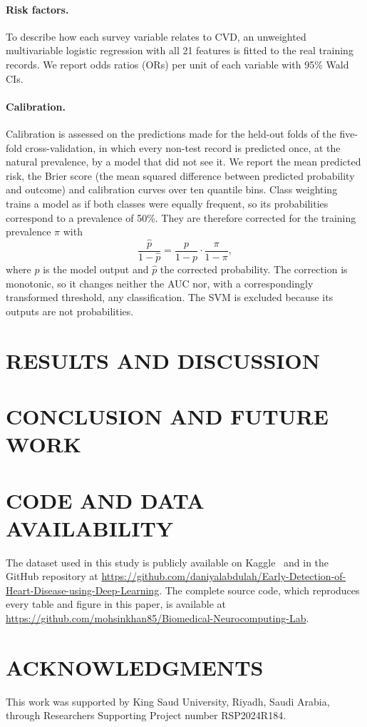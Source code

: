 \documentclass[11pt,a4paper]{article}
\begin{document}
\paragraph{Risk factors.} To describe how each survey variable relates to
CVD, an unweighted multivariable logistic regression with all 21 features
is fitted to the real training records. We report odds ratios (ORs) per
unit of each variable with 95\% Wald CIs.

\paragraph{Calibration.} Calibration is assessed on the predictions made
for the held-out folds of the five-fold cross-validation, in which every
non-test
record is predicted once, at the natural prevalence, by a model that did not
see it. We report the mean predicted risk, the Brier score (the mean squared
difference between predicted probability and outcome) and calibration curves
over ten quantile bins. Class weighting trains a model as if both classes
were equally frequent, so its probabilities correspond to a prevalence of
50\%. They are therefore corrected for the training prevalence $\pi$ with
\begin{equation}
\frac{\hat{p}}{1-\hat{p}} = \frac{p}{1-p} \cdot \frac{\pi}{1-\pi},
\end{equation}
where $p$ is the model output and $\hat{p}$ the corrected probability. The
correction is monotonic, so it changes neither the AUC nor, with a
correspondingly transformed threshold, any classification. The SVM is
excluded because its outputs are not probabilities.

\section{RESULTS AND DISCUSSION}
\label{sec:results}



\section{CONCLUSION AND FUTURE WORK}
\label{sec:conclusion}



\section*{CODE AND DATA AVAILABILITY}

The dataset used in this study is publicly available on
Kaggle~\cite{teboul} and in the GitHub repository at
\url{https://github.com/daniyalabdulah/Early-Detection-of-Heart-Disease-using-Deep-Learning}.
The complete source code, which reproduces every table and figure in this
paper, is available at
\url{https://github.com/mohsinkhan85/Biomedical-Neurocomputing-Lab}.

\section*{ACKNOWLEDGMENTS}

This work was supported by King Saud University, Riyadh, Saudi Arabia,
through Researchers Supporting Project number RSP2024R184.


\end{document}
